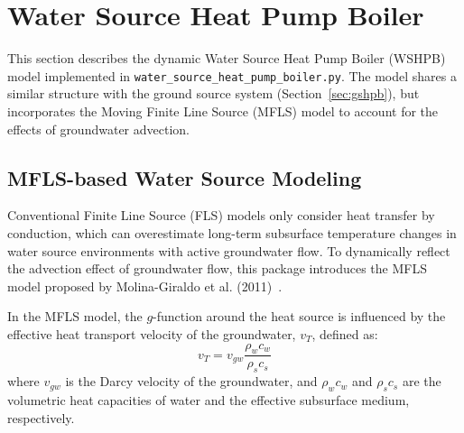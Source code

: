 \section{Water Source Heat Pump Boiler}
\label{sec:wshpb}

This section describes the dynamic Water Source Heat Pump Boiler (WSHPB) model implemented in \texttt{water\_source\_heat\_pump\_boiler.py}. The model shares a similar structure with the ground source system (Section~\ref{sec:gshpb}), but incorporates the Moving Finite Line Source (MFLS) model to account for the effects of groundwater advection.

\subsection{MFLS-based Water Source Modeling}

Conventional Finite Line Source (FLS) models only consider heat transfer by conduction, which can overestimate long-term subsurface temperature changes in water source environments with active groundwater flow. To dynamically reflect the advection effect of groundwater flow, this package introduces the MFLS model proposed by Molina-Giraldo et al. (2011)~\cite{molina2011moving}.

In the MFLS model, the $g$-function around the heat source is influenced by the effective heat transport velocity of the groundwater, $v_T$, defined as:
\begin{equation}\label{eq:mfls-vt}
  v_T = v_{gw}\frac{\rho_w c_w}{\rho_s c_s}
\end{equation}
where $v_{gw}$ is the Darcy velocity of the groundwater, and $\rho_w c_w$ and $\rho_s c_s$ are the volumetric heat capacities of water and the effective subsurface medium, respectively.

